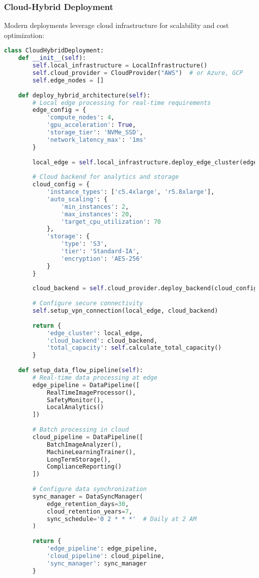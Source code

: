 \subsubsection{Cloud-Hybrid Deployment}
Modern deployments leverage cloud infrastructure for scalability and cost optimization:

\begin{lstlisting}[language=Python, caption={Cloud-Hybrid Infrastructure Management}, label={lst:cloud-hybrid}]
class CloudHybridDeployment:
    def __init__(self):
        self.local_infrastructure = LocalInfrastructure()
        self.cloud_provider = CloudProvider("AWS")  # or Azure, GCP
        self.edge_nodes = []
        
    def deploy_hybrid_architecture(self):
        # Local edge processing for real-time requirements
        edge_config = {
            'compute_nodes': 4,
            'gpu_acceleration': True,
            'storage_tier': 'NVMe_SSD',
            'network_latency_max': '1ms'
        }
        
        local_edge = self.local_infrastructure.deploy_edge_cluster(edge_config)
        
        # Cloud backend for analytics and storage
        cloud_config = {
            'instance_types': ['c5.4xlarge', 'r5.8xlarge'],
            'auto_scaling': {
                'min_instances': 2,
                'max_instances': 20,
                'target_cpu_utilization': 70
            },
            'storage': {
                'type': 'S3',
                'tier': 'Standard-IA',
                'encryption': 'AES-256'
            }
        }
        
        cloud_backend = self.cloud_provider.deploy_backend(cloud_config)
        
        # Configure secure connectivity
        self.setup_vpn_connection(local_edge, cloud_backend)
        
        return {
            'edge_cluster': local_edge,
            'cloud_backend': cloud_backend,
            'total_capacity': self.calculate_total_capacity()
        }
    
    def setup_data_flow_pipeline(self):
        # Real-time data processing at edge
        edge_pipeline = DataPipeline([
            RealTimeImageProcessor(),
            SafetyMonitor(),
            LocalAnalytics()
        ])
        
        # Batch processing in cloud
        cloud_pipeline = DataPipeline([
            BatchImageAnalyzer(),
            MachineLearningTrainer(),
            LongTermStorage(),
            ComplianceReporting()
        ])
        
        # Configure data synchronization
        sync_manager = DataSyncManager(
            edge_retention_days=30,
            cloud_retention_years=7,
            sync_schedule='0 2 * * *'  # Daily at 2 AM
        )
        
        return {
            'edge_pipeline': edge_pipeline,
            'cloud_pipeline': cloud_pipeline,
            'sync_manager': sync_manager
        }
\end{lstlisting}

